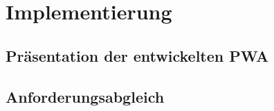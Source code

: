 \chapter{Implementierung}

\section{Präsentation der entwickelten PWA}

\section{Anforderungsabgleich}

